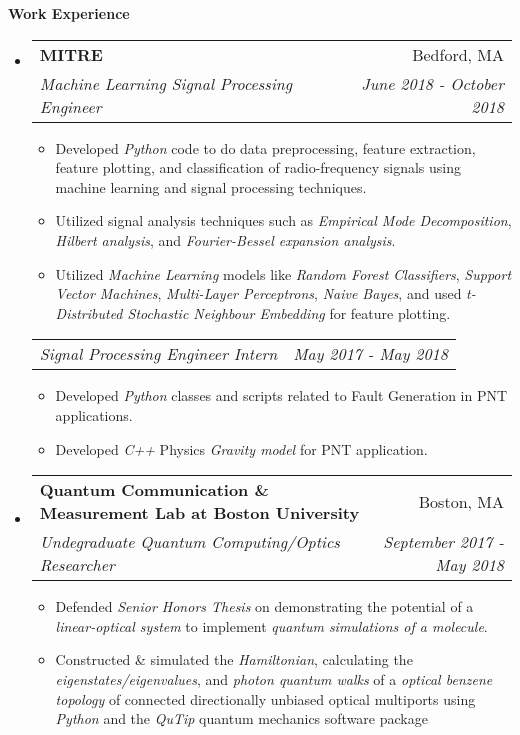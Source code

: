 \documentclass[letterpaper, 8pt]{extarticle}
\makeatletter
\newcommand{\resitem}[1]{\item #1 \vspace{-2pt}}
\newcommand{\resheading}[1]{{\large \colorbox{mygrey}{\begin{minipage}{0.99\textwidth}{\textbf{#1 \vphantom{p\^{E}}}}\end{minipage}}}}
\newcommand{\ressubheading}[4]{
\begin{tabular*}{7.40in}{l@{\extracolsep{\fill}}r}
		\textbf{#1} & #2 \\
		\textit{#3} & \textit{#4} \\
\end{tabular*}\vspace{-6pt}}
\newcommand{\rehead}[2]{
\begin{tabular*}{7.40in}{l@{\extracolsep{\fill}}r}
        \textit{#1} & \textit{#2} \\
\end{tabular*}\vspace{-6pt}}
\makeatother
\begin{document}
\resheading{Work Experience}
\begin{itemize}
\setlength{\leftmargini}{0.5em}
\item
	\ressubheading{MITRE}{Bedford, MA}{Machine Learning Signal Processing Engineer}{June 2018 - October 2018}
	\begin{itemize}
		\resitem{Developed \emph{Python} code to do data preprocessing, feature extraction, feature plotting, and classification of radio-frequency signals using machine learning and signal processing techniques.}
        \resitem{Utilized signal analysis techniques such as \emph{Empirical Mode Decomposition}, \emph{Hilbert analysis}, and \emph{Fourier-Bessel expansion analysis}.}
        \resitem{Utilized \emph{Machine Learning} models like \emph{Random Forest Classifiers}, \emph{Support Vector Machines}, \emph{Multi-Layer Perceptrons}, \emph{Naive Bayes}, and used \emph{t-Distributed Stochastic Neighbour Embedding} for feature plotting.}
	\end{itemize}
	\vspace{-3pt}
	\rehead{Signal Processing Engineer Intern}{May 2017 - May 2018}
	\begin{itemize}
		\resitem{Developed \emph{Python} classes and scripts related to Fault Generation in PNT applications.}
		\resitem{Developed \emph{C++} Physics \emph{Gravity model} for PNT application.}
	\end{itemize}
\item
	\ressubheading{Quantum Communication \& Measurement Lab at Boston University}{Boston, MA}{Undegraduate Quantum Computing/Optics Researcher}{September 2017 - May 2018}
	\begin{itemize}
	    \resitem{Defended \emph{Senior Honors Thesis} on demonstrating the potential of a \emph{linear-optical system} to implement \emph{quantum simulations of a molecule}.}
        \resitem{Constructed \& simulated the \emph{Hamiltonian}, calculating the \emph{eigenstates/eigenvalues}, and \emph{photon quantum walks} of a \emph{optical benzene topology} of connected directionally unbiased optical multiports using \emph{Python} and the \emph{QuTip} quantum mechanics software package}

\end{itemize}
\end{itemize}
\end{document}
